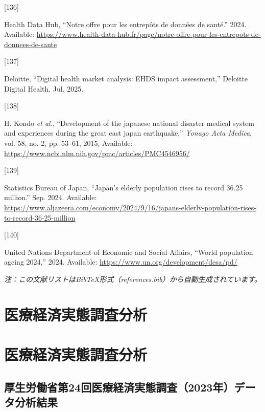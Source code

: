 \documentclass[
  a4paper,
  a4paper,
  11pt]{ltjsbook}
\newlength{\cslhangindent}
\newlength{\csllabelwidth}
\newenvironment{CSLReferences}[2] %
 {\begin{list}{}{%
  \setlength{\itemindent}{0pt}
  \setlength{\leftmargin}{0pt}
  \setlength{\parsep}{0pt}
  \ifodd #1
   \setlength{\leftmargin}{\cslhangindent}
   \setlength{\itemindent}{-1\cslhangindent}
  \fi
  \setlength{\itemsep}{#2\baselineskip}}}
 {\end{list}}
\newcommand{\CSLLeftMargin}[1]{\parbox[t]{\csllabelwidth}{\strut#1\strut}}
\newcommand{\CSLRightInline}[1]{\parbox[t]{\linewidth - \csllabelwidth}{\strut#1\strut}}
\begin{document}
\begin{CSLReferences}{0}{0}
\CSLLeftMargin{{[}136{]} }%
\CSLRightInline{Health Data Hub, {``Notre offre pour les entrepôts de
données de santé.''} 2024. Available:
\url{https://www.health-data-hub.fr/page/notre-offre-pour-les-entrepots-de-donnees-de-sante}}

\CSLLeftMargin{{[}137{]} }%
\CSLRightInline{Deloitte, {``Digital health market analysis: EHDS impact
assessment,''} Deloitte Digital Health, Jul. 2025.}

\CSLLeftMargin{{[}138{]} }%
\CSLRightInline{H. Kondo \emph{et al.}, {``Development of the japanese
national disaster medical system and experiences during the great east
japan earthquake,''} \emph{Yonago Acta Medica}, vol. 58, no. 2, pp.
53--61, 2015, Available:
\url{https://www.ncbi.nlm.nih.gov/pmc/articles/PMC4546956/}}

\CSLLeftMargin{{[}139{]} }%
\CSLRightInline{Statistics Bureau of Japan, {``Japan's elderly
population rises to record 36.25 million.''} Sep. 2024. Available:
\url{https://www.aljazeera.com/economy/2024/9/16/japans-elderly-population-rises-to-record-36-25-million}}

\CSLLeftMargin{{[}140{]} }%
\CSLRightInline{United Nations Department of Economic and Social
Affairs, {``World population ageing 2024,''} 2024. Available:
\url{https://www.un.org/development/desa/pd/}}

\end{CSLReferences}

\emph{注：この文献リストはBibTeX形式（references.bib）から自動生成されています。}

\chapter{医療経済実態調査分析}\label{ux533bux7642ux7d4cux6e08ux5b9fux614bux8abfux67fbux5206ux6790}

\chapter{医療経済実態調査分析}\label{ux533bux7642ux7d4cux6e08ux5b9fux614bux8abfux67fbux5206ux6790-1}

\section{厚生労働省第24回医療経済実態調査（2023年）データ分析結果}\label{ux539aux751fux52b4ux50cdux7701ux7b2c24ux56deux533bux7642ux7d4cux6e08ux5b9fux614bux8abfux67fb2023ux5e74ux30c7ux30fcux30bfux5206ux6790ux7d50ux679c}
\end{document}
